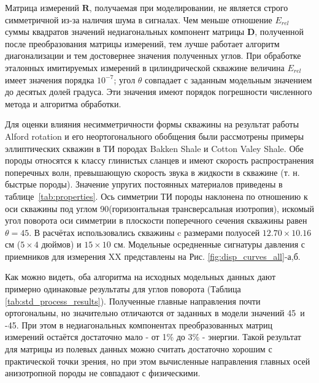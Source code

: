 \documentclass[a4paper,11pt]{article}
\begin{document}
Матрица измерений $\mathbf{R}$, получаемая при моделировании, не является строго симметричной из-за наличия шума в сигналах. Чем меньше отношение $E_{rel}$ суммы квадратов значений недиагональных компонент матрицы $\mathbf{D}$, полученной после преобразования матрицы измерений, тем лучше работает алгоритм диагонализации и тем достовернее значения полученных углов. При обработке эталонных имитируемых измерений в цилиндрической скважине величина $E_{rel}$ имеет значения порядка $10^{-7}$; угол $\theta$ совпадает с заданным модельным значением до десятых долей градуса. Эти значения имеют порядок погрешности численного метода и алгоритма обработки. 

Для оценки влияния несимметричности формы скважины на результат работы Alford rotation и его неортогонального обобщения были рассмотрены примеры эллиптических скважин в ТИ породах  Bakken Shale и Cotton Valey Shale. Обе породы относятся к классу глинистых сланцев и имеют скорость распространения поперечных волн, превышающую скорость звука в жидкости в скважине (т. н. быстрые породы). Значение упругих постоянных материалов приведены в таблице~\ref{tab:properties}. Ось симметрии ТИ породы наклонена по отношению к оси скважины под углом 90\textdegree (горизонтальная трансверсальная изотропия), искомый угол поворота оси симметрии в плоскости поперечного сечения скважины равен $\theta = 45$\textdegree. В расчётах использовались скважины c размерами полуосей $12.70 \times 10.16$ см ($5 \times 4$ дюймов) и $15 \times 10$ см. Модельные осредненные сигнатуры давления с приемников для измерения XX представлены на Рис. \ref{fig:disp_curves_all}-а,б.

Как можно видеть, оба алгоритма на исходных модельных данных дают примерно одинаковые результаты для углов поворота (Таблица \ref{tab:std_process_results}). Полученные главные направления почти ортогональны, но значительно отличаются от заданных в модели значений 45\textdegree \ и -45\textdegree. При этом в недиагональных компонентах преобразованных матриц измерений остаётся достаточно мало - от 1\% до 3\% - энергии. Такой результат для матрицы из полевых данных можно считать достаточно хорошим с практической точки зрения, но при этом вычисленные направления главных осей анизотропной породы не совпадают с физическими.
\end{document}
